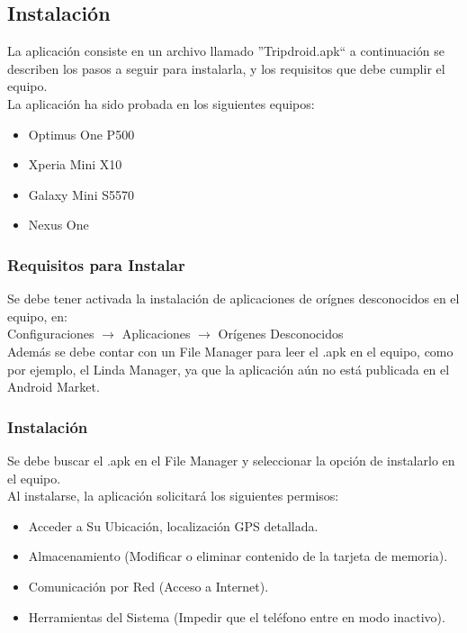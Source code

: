 \documentclass[10pt,letterpaper]{article}
\begin{document}
\subsection{Instalación}

La aplicación consiste en un archivo llamado ''Tripdroid.apk`` a continuación se describen los pasos a seguir para instalarla, y los requisitos que debe cumplir el equipo.\\

La aplicación ha sido probada en los siguientes equipos:\\

\begin{itemize}
 \item Optimus One P500
 \item Xperia Mini X10
 \item Galaxy Mini S5570
 \item Nexus One
\end{itemize}

\subsubsection{Requisitos para Instalar}

Se debe tener activada la instalación de aplicaciones de orígnes desconocidos en el equipo, en:\\

Configuraciones $\rightarrow$ Aplicaciones $\rightarrow$ Orígenes Desconocidos\\

Además se debe contar con un File Manager para leer el .apk en el equipo, como por ejemplo, el Linda Manager, ya que la aplicación aún no está publicada en el Android Market.\\

\subsubsection{Instalación}

Se debe buscar el .apk en el File Manager y seleccionar la opción de instalarlo en el equipo.\\

Al instalarse, la aplicación solicitará los siguientes permisos:\\

\begin{itemize}
 \item Acceder a Su Ubicación, localización GPS detallada.
 \item Almacenamiento (Modificar o eliminar contenido de la tarjeta de memoria).
 \item Comunicación por Red (Acceso a Internet).
 \item Herramientas del Sistema (Impedir que el teléfono entre en modo inactivo).
\end{itemize}
\end{document}
